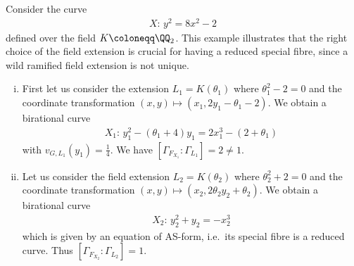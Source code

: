 \begin{example}
    Consider the curve
    \begin{align}
        X: \, y^2 = 8x^2 - 2
    \end{align}
    defined over the field $K \coloneqq \QQ_2$.
    This example illustrates that the right choice of the field extension is crucial for having a reduced special fibre,
    since a wild ramified field extension is not unique.
    \begin{enumerate}[(i)]
        \item First let us consider the extension $L_1 = K(\theta_1)$ where $\theta_1^2 - 2 = 0$ and the coordinate transformation
            $(x,y) \mapsto (x_1, 2y_1 - \theta_1 - 2)$.
            We obtain a birational curve
            \begin{align}
                X_1: \, y_1^2 - (\theta_1 + 4)y_1 = 2x_1^3 - (2 + \theta_1)
            \end{align}
            with $v_{{\scriptscriptstyle G}, L_1}(y_1) = \frac{1}{4}$.
            We have $[\Gamma_{F_{X_1}}: \Gamma_{L_1}] = 2 \neq 1$.
        \item Let us consider the field extension $L_2 = K(\theta_2)$ where $\theta_2^2 + 2 = 0$
            and the coordinate transformation $(x,y) \mapsto (x_2, 2\theta_2 y_2 + \theta_2)$.
            We obtain a birational curve
            \begin{align}
                X_2: \, y_2^2 + y_2 = -x_2^3
            \end{align}
            which is given by an equation of AS-form, i.e.\ its special fibre is a reduced curve.
            Thus $[\Gamma_{F_{X_2}}: \Gamma_{L_2}] = 1$.
    \end{enumerate}
\end{example}
